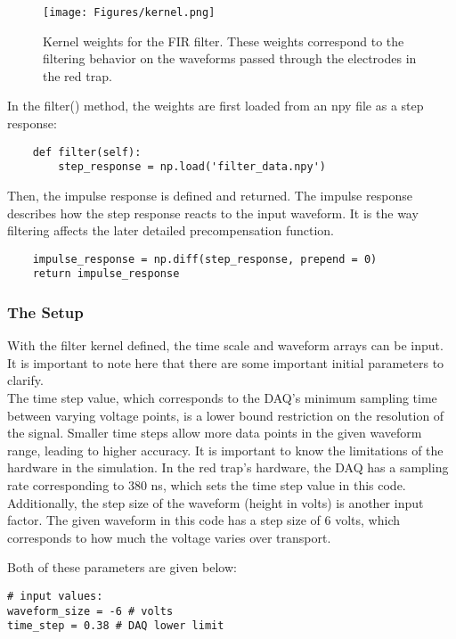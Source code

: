 \begin{figure}[h!]
    \centering
\texttt{[image: Figures/kernel.png]}
    \caption{Kernel weights for the FIR filter. These weights correspond to the filtering behavior on the waveforms passed through the electrodes in the red trap.}
\end{figure} \label{kernel}

In the filter() method, the weights are first loaded from an npy file as a step response:

\begin{verbatim}
    def filter(self):
        step_response = np.load('filter_data.npy')
\end{verbatim}

Then, the impulse response is defined and returned. The impulse response describes how the step response reacts to the input waveform. It is the way filtering affects the later detailed precompensation function.

\begin{verbatim}
    impulse_response = np.diff(step_response, prepend = 0)
    return impulse_response
\end{verbatim}

\subsubsection{The Setup}
With the filter kernel defined, the time scale and waveform arrays can be input. It is important to note here that there are some important initial parameters to clarify. 
\\
The time step value, which corresponds to the DAQ's minimum sampling time between varying voltage points, is a lower bound restriction on the resolution of the signal. Smaller time steps allow more data points in the given waveform range, leading to higher accuracy. It is important to know the limitations of the hardware in the simulation. In the red trap's hardware, the DAQ has a sampling rate corresponding to 380 ns, which sets the time step value in this code.
\\
Additionally, the step size of the waveform (height in volts) is another input factor. The given waveform in this code has a step size of 6 volts, which corresponds to how much the voltage varies over transport.

Both of these parameters are given below:

\begin{verbatim}
# input values:
waveform_size = -6 # volts
time_step = 0.38 # DAQ lower limit
\end{verbatim}

